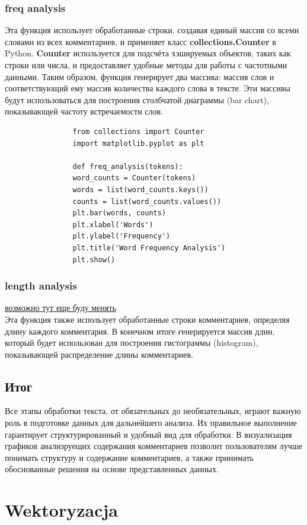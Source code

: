 		\subsubsection{freq analysis}
			Эта функция использует обработанные строки, создавая единый массив со всеми словами из всех комментариев, и применяет класс \textbf{collections.Counter} в Python. \textbf{Counter} используется для подсчёта хэшируемых объектов, таких как строки или числа, и предоставляет удобные методы для работы с частотными данными. Таким образом, функция генерирует два массива: массив слов и соответствующий ему массив количества каждого слова в тексте. Эти массивы будут использоваться для построения столбчатой диаграммы (bar chart), показывающей частоту встречаемости слов.
				
			\begin{verbatim}
				from collections import Counter
				import matplotlib.pyplot as plt

				def freq_analysis(tokens):
				word_counts = Counter(tokens)
				words = list(word_counts.keys())
				counts = list(word_counts.values())
				plt.bar(words, counts)
				plt.xlabel('Words')
				plt.ylabel('Frequency')
				plt.title('Word Frequency Analysis')
				plt.show()
			\end{verbatim}
		
		\subsubsection{length analysis}
			\underline{возможно тут еще буду менять} \\
			Эта функция также использует обработанные строки комментариев, определяя длину каждого комментария. В конечном итоге генерируется массив длин, который будет использован для построения гистограммы (histogram), показывающей распределение длины комментариев.
	
	\subsection{Итог}
		Все этапы обработки текста, от обязательных до необязательных, играют важную роль в подготовке данных для дальнейшего анализа. Их правильное выполнение гарантирует структурированный и удобный вид для обработки. В визуализация графиков анализруещих содержания комментариев позволит пользователям лучше понимать структуру и содержание комментариев, а также принимать обоснованные решения на основе представленных данных.
	
	
\section{Wektoryzacja}
	
